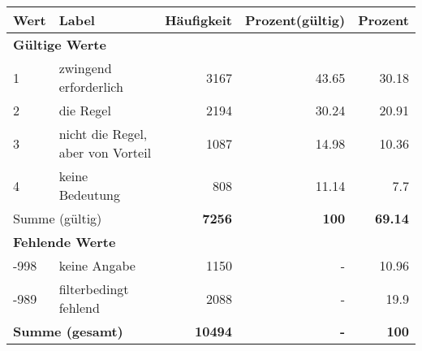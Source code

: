      \begin{longtable}{lXrrr}
     \toprule
     \textbf{Wert} & \textbf{Label} & \textbf{Häufigkeit} & \textbf{Prozent(gültig)} & \textbf{Prozent} \\
     \endhead
     \midrule
     \multicolumn{5}{l}{\textbf{Gültige Werte}}\\

     1 &
     \multicolumn{1}{X}{ zwingend erforderlich   } &


       \num{3167} &
       \num[round-mode=places,round-precision=2]{43,65} &
         \num[round-mode=places,round-precision=2]{30,18} \\

     2 &
     \multicolumn{1}{X}{ die Regel   } &


       \num{2194} &
       \num[round-mode=places,round-precision=2]{30,24} &
         \num[round-mode=places,round-precision=2]{20,91} \\

     3 &
     \multicolumn{1}{X}{ nicht die Regel, aber von Vorteil   } &


       \num{1087} &
       \num[round-mode=places,round-precision=2]{14,98} &
         \num[round-mode=places,round-precision=2]{10,36} \\

     4 &
     \multicolumn{1}{X}{ keine Bedeutung   } &


       \num{808} &
       \num[round-mode=places,round-precision=2]{11,14} &
         \num[round-mode=places,round-precision=2]{7,7} \\
     \midrule
     \multicolumn{2}{l}{Summe (gültig)} &
       \textbf{\num{7256}} &
     \textbf{100} &
       \textbf{\num[round-mode=places,round-precision=2]{69,14}} \\
     \multicolumn{5}{l}{\textbf{Fehlende Werte}}\\
       -998 &
       keine Angabe &
         \num{1150} &
        - &
         \num[round-mode=places,round-precision=2]{10,96} \\
       -989 &
       filterbedingt fehlend &
         \num{2088} &
        - &
         \num[round-mode=places,round-precision=2]{19,9} \\
     \midrule
     \multicolumn{2}{l}{\textbf{Summe (gesamt)}} &
          \textbf{\num{10494}} &
        \textbf{-} &
        \textbf{100} \\
     \bottomrule
     \end{longtable}
     
